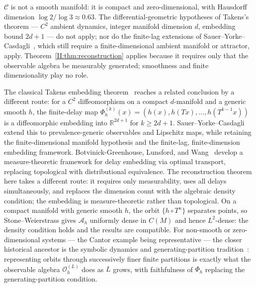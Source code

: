\begin{example}
$\mathcal{C}$ is not a smooth manifold: it is compact and zero-dimensional,
with Hausdorff dimension $\log 2/\log 3 \approx 0.63$.  The differential-geometric
hypotheses of Takens's theorem --- $C^2$ ambient dynamics, integer manifold
dimension $d$, embedding bound $2d+1$ --- do not apply; nor do the finite-lag extensions of
Sauer--Yorke--Casdagli~\cite{SauerYorkeCasdagli1991}, which still require a
finite-dimensional ambient manifold or attractor, apply.
Theorem~\ref{II:thm:reconstruction} applies because it requires only that the
observable algebra be measurably generated; smoothness and finite dimensionality
play no role.
\end{example}

The classical Takens embedding theorem~\cite{Takens1981} reaches a related
conclusion by a different route: for a $C^2$ diffeomorphism on a compact
$d$-manifold and a generic smooth $h$, the finite-delay map
$\Phi_h^{(k)}(x) = (h(x), h(Tx), \ldots, h(T^{k-1}x))$ is a diffeomorphic
embedding into $\mathbb{R}^{2d+1}$ for $k \geq 2d+1$.
Sauer--Yorke--Casdagli~\cite{SauerYorkeCasdagli1991} extend this to
prevalence-generic observables and Lipschitz maps, while retaining the
finite-dimensional manifold hypothesis and the finite-lag, finite-dimension
embedding framework.  Botvinick-Greenhouse, Lunsford, and
Wang~\cite{BotvinickGreenhouse2025} develop a measure-theoretic
framework for delay embedding via optimal transport, replacing
topological with distributional equivalence.  The reconstruction
theorem here takes a different route: it requires only measurability,
uses all delays simultaneously, and replaces the dimension count with
the algebraic density condition; the embedding is measure-theoretic
rather than topological.  On a compact manifold
with generic smooth $h$, the orbit $\{h \circ T^n\}$ separates points, so
Stone--Weierstrass gives $\mathcal{A}_h$ uniformly dense in $C(M)$ and hence
$L^2$-dense: the density condition holds and the results are compatible.  For non-smooth or zero-dimensional systems — the Cantor example
being representative — the closer historical ancestor is the symbolic dynamics
and generating-partition tradition~\cite{Adler1998}: representing orbits
through successively finer finite partitions is exactly what the observable
algebra $\mathcal{O}_h^{(L)}$ does as $L$ grows, with faithfulness of $\Phi_h$
replacing the generating-partition condition.

